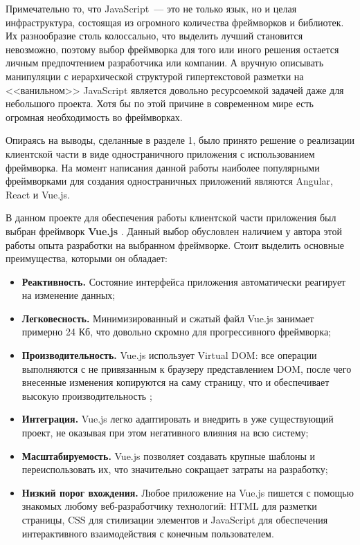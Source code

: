Примечательно то, что JavaScript~--- это не только язык, но и целая инфраструктура, состоящая из огромного количества фреймворков и библиотек. Их разнообразие столь колоссально, что выделить лучший становится невозможно, поэтому выбор фреймворка для того или иного решения остается личным предпочтением разработчика или компании. А вручную описывать манипуляции с иерархической структурой гипертекстовой разметки на <<ванильном>> JavaScript является довольно ресурсоемкой задачей даже для небольшого проекта. Хотя бы по этой причине в современном мире есть огромная необходимость во фреймворках.

Опираясь на выводы, сделанные в разделе 1, было принято решение о реализации клиентской части в виде одностраничного приложения с использованием фреймворка. На момент написания данной работы наиболее популярными фреймворками для создания одностраничных приложений являются Angular, React и Vue.js.

В данном проекте для обеспечения работы клиентской части приложения был выбран фреймворк \textbf{Vue.js} \cite{vuejs}. Данный выбор обусловлен наличием у автора этой работы опыта разработки на выбранном фреймворке. Стоит выделить основные преимущества, которыми он обладает:

\begin{itemize}
	\item \textbf{Реактивность.} Состояние интерфейса приложения автоматически реагирует на изменение данных;
	\item \textbf{Легковесность.} Минимизированный и сжатый файл Vue.js занимает примерно 24 Кб, что довольно скромно для прогрессивного фреймворка;
	\item \textbf{Производительность.} Vue.js использует Virtual DOM: все операции выполняются с не привязанным к браузеру представлением DOM, после чего внесенные изменения копируются на саму страницу, что и обеспечивает высокую производительность \cite{stefankrause};
	\item \textbf{Интеграция.} Vue.js легко адаптировать и внедрить в уже существующий проект, не оказывая при этом негативного влияния на всю систему;
	\item \textbf{Масштабируемость.} Vue.js позволяет создавать крупные шаблоны и переиспользовать их, что значительно сокращает затраты на разработку;
	\item \textbf{Низкий порог вхождения.} Любое приложение на Vue.js пишется с помощью знакомых любому веб-разработчику технологий: HTML для разметки страницы, CSS для стилизации элементов и JavaScript для обеспечения интерактивного взаимодействия с конечным пользователем.
\end{itemize}


